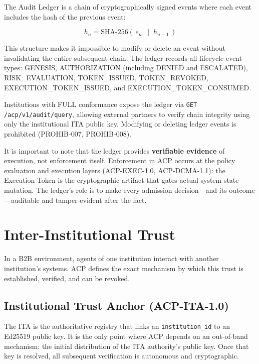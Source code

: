 \documentclass[11pt]{article}
\theoremstyle{definition}
\begin{document}
The Audit Ledger is a chain of cryptographically signed events where each event includes the hash of the previous event:

\[
h_n = \text{SHA-256}(\,e_n \;\|\; h_{n-1}\,)
\]

This structure makes it impossible to modify or delete an event without invalidating the entire subsequent chain.
The ledger records all lifecycle event types: GENESIS, AUTHORIZATION (including DENIED and ESCALATED),
RISK\_EVALUATION, TOKEN\_ISSUED, TOKEN\_REVOKED, EXECUTION\_TOKEN\_ISSUED, and EXECUTION\_TOKEN\_CONSUMED.

Institutions with FULL conformance expose the ledger via \texttt{GET /acp/v1/audit/query},
allowing external partners to verify chain integrity using only the institutional ITA public key.
Modifying or deleting ledger events is prohibited (PROHIB-007, PROHIB-008).

It is important to note that the ledger provides \textbf{verifiable evidence} of execution, not enforcement itself.
Enforcement in ACP occurs at the policy evaluation and execution layers (ACP-EXEC-1.0, ACP-DCMA-1.1):
the Execution Token is the cryptographic artifact that gates actual system-state mutation.
The ledger's role is to make every admission decision---and its outcome---auditable and tamper-evident after the fact.

\section{Inter-Institutional Trust}

In a B2B environment, agents of one institution interact with another institution's systems.
ACP defines the exact mechanism by which this trust is established, verified, and can be revoked.

\subsection{Institutional Trust Anchor (ACP-ITA-1.0)}

The ITA is the authoritative registry that links an \texttt{institution\_id} to an Ed25519 public key.
It is the only point where ACP depends on an out-of-band mechanism: the initial distribution of the ITA authority's public key.
Once that key is resolved, all subsequent verification is autonomous and cryptographic.
\end{document}

